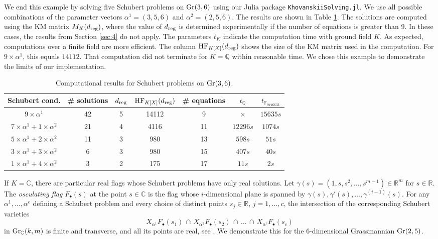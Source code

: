 \documentclass[12pt]{article}
\theoremstyle{definition}
\newenvironment{example}
  {\pushQED{\qed}\renewcommand{\qedsymbol}{$\diamond$}\examplex}
  {\popQED\endexamplex}
\theoremstyle{remark}
\newcommand{\C}{\mathbb{C}}
\begin{document}
\begin{example}[$k=3, m = 6$]
We end this example by solving five Schubert problems on ${\rm Gr}(3,6)$ using our Julia package \texttt{KhovanskiiSolving.jl}. We use all possible combinations of the parameter vectors $\alpha^1 = (3,5,6)$ and $\alpha^2 = (2,5,6)$. The results are shown in Table \ref{tab:schubert_problem_Gr_K(3,6)}. The solutions are computed using the KM matrix $M_X(d_{\rm reg})$, where the value of $d_{\rm reg}$ is determined experimentally if the number of equations is greater than 9. In these cases, the results from Section \ref{sec:4} do not apply. The parameters $t_{K}$ indicate the computation time with ground field $K$. As expected, computations over a finite field are more efficient. The column ${\rm HF}_{K[X]}(d_{\rm reg})$ shows the size of the KM matrix used in the computation. For $9 \times \alpha^1$, this equals $14112$. That computation did not terminate for $K= \mathbb{Q}$ within reasonable time. We chose this example to demonstrate the limits of our implementation.
\end{example}


\begin{table}[h]
\small
    \centering
    \begin{tabular}{c|cccccc}
Schubert  cond. & \# solutions & $d_{\rm reg}$ & ${\rm HF}_{K[X]}(d_{\rm reg})$ & \# equations & 
$t_\mathbb{Q}$ & $t_{\mathbb{F}_{9716633}}$\\ \hline
$9\times \alpha^1$ & 42 & 5 & 14112 & 9 & $\times$  & $15635s$  \\ 
$7\times \alpha^1+1\times \alpha^2$  & 21  & 4 & 4116 & 11 & $12296s$ & $1074s$  \\ 
$5\times \alpha^1+2\times\alpha^2$ & 11 & 3 & 980 & 13 & $598s$ & $51s$  \\ 
$3\times \alpha^1+3\times\alpha^2$ & 6 & 3 & 980 & 15 & $407s$ &$40s$ \\ 
$1\times \alpha^1+4\times\alpha^2$ & 3 & 2 & 175 & 17 & $11s$ & $2s$  \\ 

\end{tabular}
    \caption{Computational results for Schubert problems on ${\rm Gr}(3,6)$.}
    \label{tab:schubert_problem_Gr_K(3,6)}
\end{table}


If $K = \mathbb{C}$, there are particular real flags whose Schubert problems have only real solutions. Let $\gamma(s)=(1,s,s^2,\dots,s^{m-1})\in \mathbb{R}^m$ for $s\in \mathbb{R}$. The \emph{osculating flag} $F_\bullet(s)$ at the point $s\in\C$ is the flag whose $i$-dimensional plane is spanned by $\gamma(s), \gamma'(s), \ldots, \gamma^{(i-1)}(s)$. 
For any $\alpha^1, \ldots, \alpha^c$ defining a Schubert problem and every choice of distinct points $s_j\in \mathbb{R}$, $j=1,\dots,c$, the intersection of the corresponding Schubert varieties
    \[ X_{\alpha^1}F_\bullet(s_1) \, \cap \, X_{\alpha^2}F_\bullet(s_2) \, \cap \,  \dots \, \cap \,  X_{\alpha^c}F_\bullet(s_c)
    \] 
in ${\rm Gr}_{\mathbb{C}}(k,m)$ is finite and transverse, and all its points are real, see \cite[Theorem 9.13]{sottile2011real}. We demonstrate this for the 6-dimensional Grassmannian ${\rm Gr}(2,5)$. 
\end{document}
